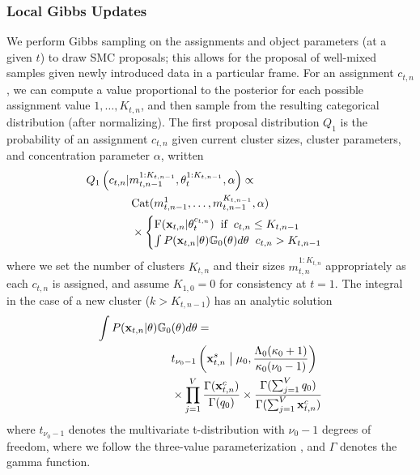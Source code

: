\documentclass{article}
\begin{document}
\subsubsection{Local Gibbs Updates}
\label{sec:localGibbsUpdate}
We perform Gibbs sampling on the assignments and object parameters (at a given $t$) to draw SMC proposals; this allows for the proposal of well-mixed samples given newly introduced data in a particular frame. For an assignment $c_{t,n}$, we can compute a value proportional to the posterior for each possible assignment value $1,\ldots,K_{t,n}$, and then sample from the resulting categorical distribution (after normalizing). The first proposal distribution $Q_1$ is the probability of an assignment $c_{t,n}$ given current cluster sizes, cluster parameters, and concentration parameter $\alpha$, written
\begin{align}
    \label{smc_proposal_1}
    \begin{split}
        &Q_1\left( c_{t,n} | m_{t,n-1}^{1:K_{t,n-1}},  \theta_t^{1:K_{t,n-1}}, \alpha \right) \propto \\
        &\hspace{14mm}\text{Cat}(m_{t,n-1}^1,\ldots,m_{t,n-1}^{K_{t,n-1}}, \alpha) \\ 
        &\hspace{14mm}\times
            \begin{cases}
                \text{F}(\mathbf{x}_{t,n} | \theta_t^{c_{t,n}}) \hspace{2mm} \text{if} \hspace{2mm} c_{t,n} \leq K_{t,n-1} \\
                \int P(\mathbf{x}_{t,n} | \theta) \mathbb{G}_{0}(\theta)d\theta \hspace{2mm} c_{t,n} > K_{t,n-1}
            \end{cases}
    \end{split}
\end{align}
where we set the number of clusters $K_{t,n}$ and their sizes $m_{t,n}^{1:K_{t,n}}$ appropriately as each $c_{t,n}$ is assigned, and assume $K_{1,0}=0$ for consistency at $t=1$. The integral in the case of a new cluster ($k > K_{t,n-1}$) has an analytic solution
\begin{equation}
    \label{marginal_obs_prob}
    \begin{split}
        \int P(\mathbf{x}_{t,n} | \theta)\mathbb{G}_{0} & (\theta) d\theta = \\
        & t_{\nu_0-1}  \left ( \mathbf{x}_{t,n}^{s}  \hspace{1mm} \big{|} \hspace{1mm} 
            \mu_0, \frac{\Lambda_0(\kappa_0+1)}{\kappa_0(\nu_0-1)} \right ) \\
        & \times \prod_{j=1}^V \frac{ \Gamma(\mathbf{x}_{t,n}^c) }  { \Gamma(q_0)}
            \times \frac{\Gamma(\sum_{j=1}^V q_0) }{\Gamma(\sum_{j=1}^V \bold{x}_{t,n}^c) }
    \end{split}
\end{equation}
where $t_{\nu_0-1}$ denotes the multivariate t-distribution with $\nu_0-1$ degrees of freedom, where we follow the three-value parameterization \cite{gelman2004bayesian},
and $\Gamma$ denotes the gamma function.
\end{document}
